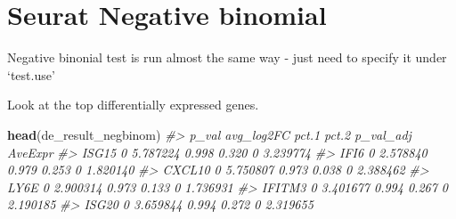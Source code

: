 \documentclass[
]{book}
\newenvironment{Shaded}{\begin{snugshade}}{\end{snugshade}}
\newcommand{\AttributeTok}[1]{\textcolor[rgb]{0.13,0.29,0.53}{#1}}
\newcommand{\CommentTok}[1]{\textcolor[rgb]{0.56,0.35,0.01}{\textit{#1}}}
\newcommand{\DecValTok}[1]{\textcolor[rgb]{0.00,0.00,0.81}{#1}}
\newcommand{\FunctionTok}[1]{\textcolor[rgb]{0.13,0.29,0.53}{\textbf{#1}}}
\newcommand{\NormalTok}[1]{#1}
\newcommand{\OtherTok}[1]{\textcolor[rgb]{0.56,0.35,0.01}{#1}}
\newcommand{\SpecialCharTok}[1]{\textcolor[rgb]{0.81,0.36,0.00}{\textbf{#1}}}
\newcommand{\StringTok}[1]{\textcolor[rgb]{0.31,0.60,0.02}{#1}}
\begin{document}
\hypertarget{seurat-negative-binomial}{%
\section{Seurat Negative binomial}\label{seurat-negative-binomial}}

Negative binonial test is run almost the same way - just need to specify it under `test.use'

\begin{Shaded}
\end{Shaded}

Look at the top differentially expressed genes.

\begin{Shaded}
\begin{Highlighting}[]
\FunctionTok{head}\NormalTok{(de\_result\_negbinom)}
\CommentTok{\#\textgreater{}        p\_val avg\_log2FC pct.1 pct.2 p\_val\_adj  AveExpr}
\CommentTok{\#\textgreater{} ISG15      0   5.787224 0.998 0.320         0 3.239774}
\CommentTok{\#\textgreater{} IFI6       0   2.578840 0.979 0.253         0 1.820140}
\CommentTok{\#\textgreater{} CXCL10     0   5.750807 0.973 0.038         0 2.388462}
\CommentTok{\#\textgreater{} LY6E       0   2.900314 0.973 0.133         0 1.736931}
\CommentTok{\#\textgreater{} IFITM3     0   3.401677 0.994 0.267         0 2.190185}
\CommentTok{\#\textgreater{} ISG20      0   3.659844 0.994 0.272         0 2.319655}
\end{Highlighting}
\end{Shaded}
\end{document}
